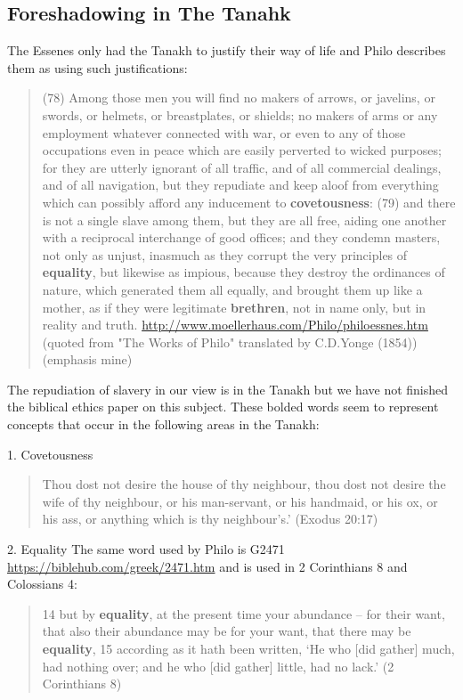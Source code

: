 \documentclass[11pt]{article}
\begin{document}
\subsection{Foreshadowing in The Tanahk} \label{foreshadowing in the tanahk}
The Essenes only had the Tanakh to justify their way of life and Philo describes them as using such justifications:
\begin{quote}
(78) Among those men you will find no makers of arrows, or javelins, or swords, or helmets, or breastplates, or shields; no makers of arms or any employment whatever connected with war, or even to any of those occupations even in peace which are easily perverted to wicked purposes; for they are utterly ignorant of all traffic, and of all commercial dealings, and of all navigation, but they repudiate and keep aloof from everything which can possibly afford any inducement to \textbf{covetousness}: (79) and there is not a single slave among them, but they are all free, aiding one another with a reciprocal interchange of good offices; and they condemn masters, not only as unjust, inasmuch as they corrupt the very principles of \textbf{equality}, but likewise as impious, because they destroy the ordinances of nature, which generated them all equally, and brought them up like a mother, as if they were legitimate \textbf{brethren}, not in name only, but in reality and truth.  \url{http://www.moellerhaus.com/Philo/philoessnes.htm} (quoted from "The Works of Philo" translated by C.D.Yonge (1854)) (emphasis mine)
\end{quote}

The repudiation of slavery in our view is in the Tanakh but we have not finished the biblical ethics paper on this subject. These bolded words seem to represent concepts that occur in the following areas in the Tanakh: \newline

1. Covetousness
\begin{quote}
Thou dost not desire the house of thy neighbour, thou dost not desire the wife of thy neighbour, or his man-servant, or his handmaid, or his ox, or his ass, or anything which is thy neighbour's.' (Exodus 20:17)
\end{quote}

2. Equality \newline
The same word used by Philo is G2471 \url{https://biblehub.com/greek/2471.htm} and is used in 2 Corinthians 8 and Colossians 4:
\begin{quote}
14 but by \textbf{equality}, at the present time your abundance -- for their want, that also their abundance may be for your want, that there may be \textbf{equality}, 15 according as it hath been written, `He who [did gather] much, had nothing over; and he who [did gather] little, had no lack.'
(2 Corinthians 8)
\end{quote}
\end{document}
